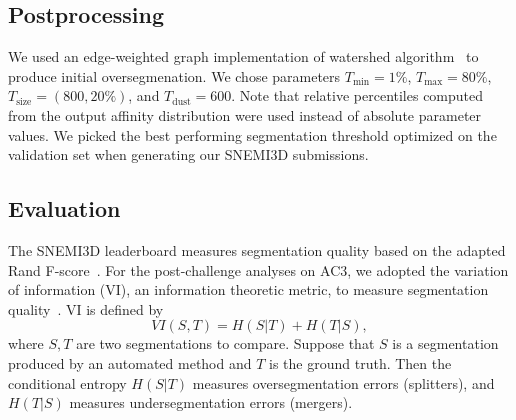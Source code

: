 \documentclass{article}
\begin{document}

\subsection{Postprocessing}

We used an edge-weighted graph implementation of watershed
algorithm~\cite{zlateski2015} to produce initial oversegmenation. We chose
parameters $T_\text{min} = 1\%$, $T_\text{max} = 80\%$, $T_\text{size} = (800,
20\%)$, and $T_\text{dust} = 600$. Note that relative percentiles computed from
the output affinity distribution were used instead of absolute parameter values.
We picked the best performing segmentation threshold optimized on the validation
set when generating our SNEMI3D submissions.

\subsection{Evaluation}

The SNEMI3D leaderboard measures segmentation quality based on the adapted Rand
F-score~\cite{rand1971,ignacio2015}. For the post-challenge analyses on AC3, we
adopted the variation of information (VI), an information theoretic metric, to
measure segmentation quality~\cite{nunez-iglesias2013,meila2007}. VI is
defined by
\begin{equation}
  VI(S,T) = H(S|T) + H(T|S),
\end{equation}
where $S,T$ are two segmentations to compare. Suppose that $S$ is a segmentation
produced by an automated method and $T$ is the ground truth. Then the
conditional entropy $H(S|T)$ measures oversegmentation errors (splitters), and
$H(T|S)$ measures undersegmentation errors (mergers).

\end{document}
